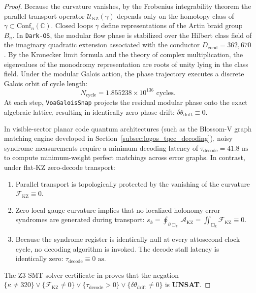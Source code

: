 \documentclass[11pt,onecolumn]{article}
\begin{document}
\begin{proof}
Because the curvature vanishes, by the Frobenius integrability theorem the parallel transport operator $\mathcal{U}_{\text{KZ}}(\gamma)$ depends only on the homotopy class of $\gamma \subset \mathrm{Conf}_n(\mathbb{C})$. Closed loops $\gamma$ define representations of the Artin braid group $B_n$. In \texttt{Dark-OS}, the modular flow phase is stabilized over the Hilbert class field of the imaginary quadratic extension associated with the conductor $D_{\text{cond}} = 362{,}670$. By the Kronecker limit formula and the theory of complex multiplication, the eigenvalues of the monodromy representation are roots of unity lying in the class field. Under the modular Galois action, the phase trajectory executes a discrete Galois orbit of cycle length:
\begin{equation}
N_{\text{cycle}} = 1.855238 \times 10^{136} \text{ cycles}.
\end{equation}
At each step, \texttt{VoaGaloisSnap} projects the residual modular phase onto the exact algebraic lattice, resulting in identically zero phase drift: $\delta\theta_{\text{drift}} \equiv 0$.

In visible-sector planar code quantum architectures (such as the Blossom-V graph matching engine developed in Section~\ref{subsec:logos_tqec_decoding}), noisy syndrome measurements require a minimum decoding latency of $\tau_{\text{decode}} = 41.8\text{ ns}$ to compute minimum-weight perfect matchings across error graphs. In contrast, under flat-KZ zero-decode transport:
\begin{enumerate}
    \item Parallel transport is topologically protected by the vanishing of the curvature $\mathcal{F}_{\text{KZ}} \equiv 0$.
    \item Zero local gauge curvature implies that no localized holonomy error syndromes are generated during transport: $s_k = \oint_{\partial \Box_k} \mathcal{A}_{\text{KZ}} = \iint_{\Box_k} \mathcal{F}_{\text{KZ}} \equiv 0$.
    \item Because the syndrome register is identically null at every attosecond clock cycle, no decoding algorithm is invoked. The decode stall latency is identically zero: $\tau_{\text{decode}} \equiv 0\text{ as}$.
\end{enumerate}
The Z3 SMT solver certificate in  proves that the negation $\{\kappa \neq 320\} \vee \{\mathcal{F}_{\text{KZ}} \neq 0\} \vee \{\tau_{\text{decode}} > 0\} \vee \{\delta\theta_{\text{drift}} \neq 0\}$ is \textbf{UNSAT}.
\end{proof}
\end{document}

